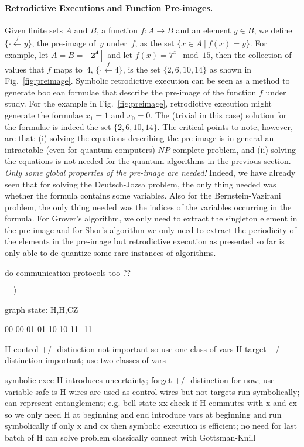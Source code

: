\documentclass{article}
\newcommand{\preim}[2]{\{\cdot\stackrel{#1}{\longleftarrow}{#2}\}}
\newcommand{\finset}[1]{[\mathbf{#1}]}
\begin{document}
\paragraph*{Retrodictive Executions and Function Pre-images.}
Given finite sets $A$ and $B$, a function $f : A \rightarrow B$ and an
element $y \in B$, we define $\preim{f}{y}$, the pre-image of~$y$
under~$f$, as the set $\{ x \in A ~|~ f(x) = y \}$. For example, let
$A = B = \finset{2^4}$ and let $f(x) = 7^x \mod 15$, then the
collection of values that $f$ maps to~4, $\preim{f}{4}$, is the set
$\{ 2, 6, 10, 14 \}$ as shown in Fig.~\ref{fig:preimage}. Symbolic
retrodictive execution can be seen as a method to generate boolean
formulae that describe the pre-image of the function $f$ under
study. For the example in Fig.~\ref{fig:preimage}, retrodictive
execution might generate the formulae $x_1=1$ and $x_0=0$. The
(trivial in this case) solution for the formulae is indeed the set $\{
2, 6, 10, 14 \}$. The critical points to note, however, are that: (i)
solving the equations describing the pre-image is in general an
intractable (even for quantum computers) $\mathit{NP}$-complete
problem, and (ii) solving the equations is not needed for the quantum
algorithms in the previous section. \emph{Only some global properties
  of the pre-image are needed!} Indeed, we have already seen that for
solving the Deutsch-Jozsa problem, the only thing needed was whether
the formula contains some variables. Also for the Bernstein-Vazirani
problem, the only thing needed was the indices of the variables
occurring in the formula. For Grover's algorithm, we only need to
extract the singleton element in the pre-image and for Shor's
algorithm we only need to extract the periodicity of the elements in
the pre-image but retrodictive execution as presented so far is only
able to de-quantize some rare instances of algorithms.

\newpage

do communication protocols too ??

$\ket{-}$ 

graph state: H,H,CZ

00   00
01   01
10   10
11 -11

H control +/- distinction not important so use one class of vars
H target +/- distinction important; use two classes of vars

  
  symbolic exec
  H introduces uncertainty; forget +/- distinction for now; use variable
  safe is H wires are used as control wires but not targets
  run symbolically; can represent entanglement; e.g. bell state xx
  check if H commutes with x and cx
  so we only need H at beginning and end
  introduce vars at beginning and run symbolically
  if only x and cx then symbolic execution is efficient; no need for last batch of H
  can solve problem classically
  connect with Gottsman-Knill
\end{document}
